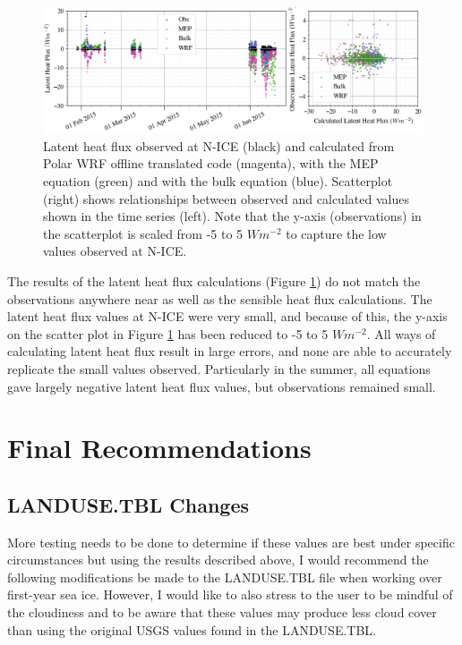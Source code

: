 {\begin{figure}[b!]
    \centering
    \includegraphics[width=1\linewidth]{figures/chapter6/latent_wrf.png}
    \caption[Latent heat flux observed at N-ICE and calculated from Polar WRF offline translated code.]{Latent heat flux observed at N-ICE (black) and calculated from Polar WRF offline translated code (magenta), with the MEP equation (green) and with the bulk equation (blue).  Scatterplot (right) shows relationships between observed and calculated values shown in the time series (left). Note that the y-axis (observations) in the scatterplot is scaled from -5 to 5 $Wm^{-2}$ to capture the low values observed at N-ICE.}
    \label{fig:flux:latent}
\end{figure}

The results of the latent heat flux calculations (Figure \ref{fig:flux:latent}) do not match the observations anywhere near as well as the sensible heat flux calculations. The latent heat flux values at N-ICE were very small, and because of this, the y-axis on the scatter plot in Figure \ref{fig:flux:latent} has been reduced to -5 to 5 $Wm^{-2}$. All ways of calculating latent heat flux result in large errors, and none are able to accurately replicate the small values observed. Particularly in the summer, all equations gave largely negative latent heat flux values, but observations remained small.


\section{Final Recommendations}

\subsection{LANDUSE.TBL Changes}

More testing needs to be done to determine if these values are best under specific circumstances but using the results described above, I would recommend the following modifications be made to the LANDUSE.TBL file when working over first-year sea ice. However, I would like to also stress to the user to be mindful of the cloudiness and to be aware that these values may produce less cloud cover than using the original USGS values found in the LANDUSE.TBL.

}
